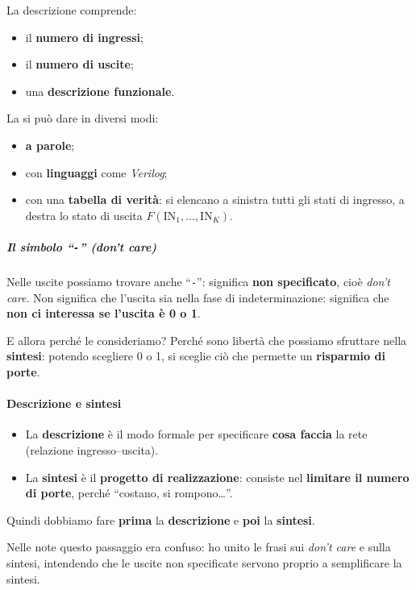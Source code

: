 \documentclass[11pt,a4paper]{article}
\begin{document}
La descrizione comprende:
\begin{itemize}[leftmargin=*]
  \item il \textbf{numero di ingressi};
  \item il \textbf{numero di uscite};
  \item una \textbf{descrizione funzionale}.
\end{itemize}

La si può dare in diversi modi:
\begin{itemize}[leftmargin=*]
  \item \textbf{a parole};
  \item con \textbf{linguaggi} come \emph{Verilog};
  \item con una \textbf{tabella di verità}: si elencano a sinistra tutti gli stati di ingresso, a destra lo stato di uscita $F(\text{IN}_1,\ldots,\text{IN}_K)$.
\end{itemize}

\subparagraph*{Il simbolo ``\texttt{-}'' (don't care)}

Nelle uscite possiamo trovare anche ``\texttt{-}'': significa \textbf{non specificato}, cioè \emph{don't care}. Non significa che l'uscita sia nella fase di indeterminazione: significa che \textbf{non ci interessa se l'uscita è 0 o 1}.

E allora perché le consideriamo? Perché sono libertà che possiamo sfruttare nella \textbf{sintesi}: potendo scegliere 0 o 1, si sceglie ciò che permette un \textbf{risparmio di porte}.

\paragraph*{Descrizione e sintesi}

\begin{itemize}[leftmargin=*]
  \item La \textbf{descrizione} è il modo formale per specificare \textbf{cosa faccia} la rete (relazione ingresso--uscita).
  \item La \textbf{sintesi} è il \textbf{progetto di realizzazione}: consiste nel \textbf{limitare il numero di porte}, perché ``costano, si rompono\ldots''.
\end{itemize}

Quindi dobbiamo fare \textbf{prima} la \textbf{descrizione} e \textbf{poi} la \textbf{sintesi}.

\begin{integrazione}
Nelle note questo passaggio era confuso: ho unito le frasi sui \emph{don't care} e sulla sintesi, intendendo che le uscite non specificate servono proprio a semplificare la sintesi.
\end{integrazione}
\end{document}
